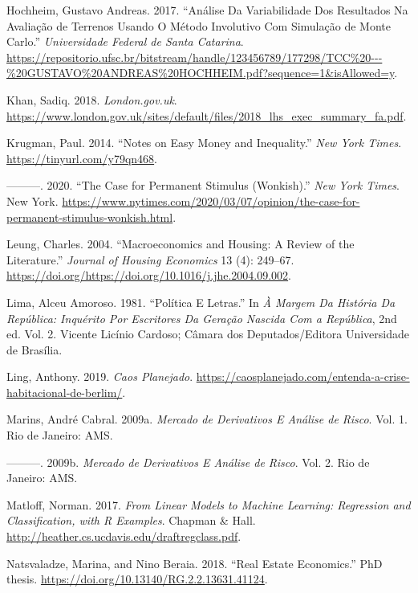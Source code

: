 \documentclass[
	12pt,				%
	oneside,			%
	a4paper,			%
	chapter=TITLE,		%
	section=TITLE,		%
	english,			%
	brazil				%
	]{abntex2}
\begin{document}
\leavevmode\hypertarget{ref-gahochheim}{}%
Hochheim, Gustavo Andreas. 2017. ``Análise Da Variabilidade Dos Resultados Na Avaliação de Terrenos Usando O Método Involutivo Com Simulação de Monte Carlo.'' \emph{Universidade Federal de Santa Catarina}. \url{https://repositorio.ufsc.br/bitstream/handle/123456789/177298/TCC\%20---\%20GUSTAVO\%20ANDREAS\%20HOCHHEIM.pdf?sequence=1\&isAllowed=y}.

\leavevmode\hypertarget{ref-londres}{}%
Khan, Sadiq. 2018. \emph{London.gov.uk}. \url{https://www.london.gov.uk/sites/default/files/2018_lhs_exec_summary_fa.pdf}.

\leavevmode\hypertarget{ref-krugman}{}%
Krugman, Paul. 2014. ``Notes on Easy Money and Inequality.'' \emph{New York Times}. \url{https://tinyurl.com/y79qn468}.

\leavevmode\hypertarget{ref-krugman2020}{}%
---------. 2020. ``The Case for Permanent Stimulus (Wonkish).'' \emph{New York Times}. New York. \url{https://www.nytimes.com/2020/03/07/opinion/the-case-for-permanent-stimulus-wonkish.html}.

\leavevmode\hypertarget{ref-LEUNG}{}%
Leung, Charles. 2004. ``Macroeconomics and Housing: A Review of the Literature.'' \emph{Journal of Housing Economics} 13 (4): 249--67. \url{https://doi.org/https://doi.org/10.1016/j.jhe.2004.09.002}.

\leavevmode\hypertarget{ref-amoroso}{}%
Lima, Alceu Amoroso. 1981. ``Política E Letras.'' In \emph{À Margem Da História Da República: Inquérito Por Escritores Da Geração Nascida Com a República}, 2nd ed. Vol. 2. Vicente Licínio Cardoso; Câmara dos Deputados/Editora Universidade de Brasília.

\leavevmode\hypertarget{ref-berlim}{}%
Ling, Anthony. 2019. \emph{Caos Planejado}. \url{https://caosplanejado.com/entenda-a-crise-habitacional-de-berlim/}.

\leavevmode\hypertarget{ref-marins1}{}%
Marins, André Cabral. 2009a. \emph{Mercado de Derivativos E Análise de Risco}. Vol. 1. Rio de Janeiro: AMS.

\leavevmode\hypertarget{ref-marins2}{}%
---------. 2009b. \emph{Mercado de Derivativos E Análise de Risco}. Vol. 2. Rio de Janeiro: AMS.

\leavevmode\hypertarget{ref-matloff2017}{}%
Matloff, Norman. 2017. \emph{From Linear Models to Machine Learning: Regression and Classification, with R Examples}. Chapman \& Hall. \url{http://heather.cs.ucdavis.edu/draftregclass.pdf}.

\leavevmode\hypertarget{ref-realestate}{}%
Natsvaladze, Marina, and Nino Beraia. 2018. ``Real Estate Economics.'' PhD thesis. \url{https://doi.org/10.13140/RG.2.2.13631.41124}.
\end{document}

